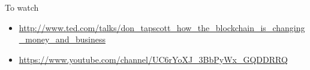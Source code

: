 \documentclass[presentation]{beamer}
\begin{document}
\begin{frame}[label=sec-7-2]{To watch}
\begin{itemize}
\item \url{http://www.ted.com/talks/don_tapscott_how_the_blockchain_is_changing_money_and_business}
\item \url{https://www.youtube.com/channel/UC6rYoXJ_3BbPyWx_GQDDRRQ}
\end{itemize}
\end{frame}
\end{document}
